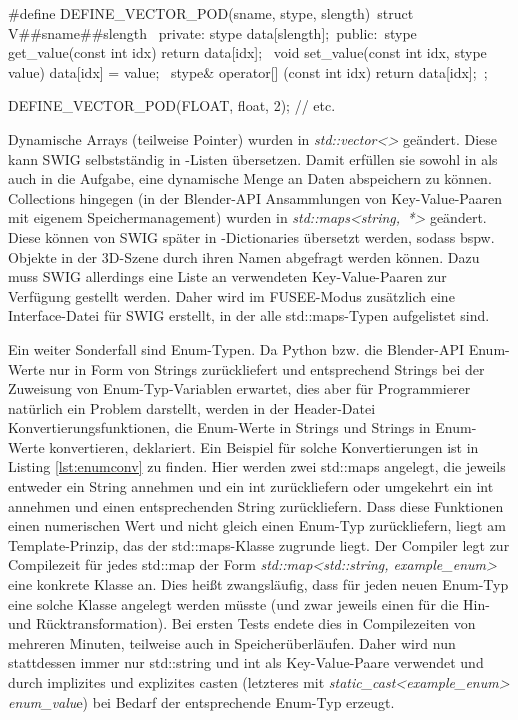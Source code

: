 \begin{code}[caption={Deklaration der Vektordatentypen mittels \protect\#define},label={lst:vfloat}]
#define DEFINE_VECTOR_POD(sname, stype, slength)\
	struct V##sname##slength {\
	private:
		stype data[slength];\
	public:\
		stype get_value(const int idx) { return data[idx]; }\
		void set_value(const int idx, stype value) { data[idx] = value; }\
		stype& operator[] (const int idx) {return data[idx];}\
	};

DEFINE_VECTOR_POD(FLOAT, float, 2);  // etc.
\end{code}

Dynamische Arrays (teilweise Pointer) wurden in \emph{std::vector<>} geändert. Diese kann SWIG selbstständig in \CS{}-Listen übersetzen. Damit erfüllen sie sowohl in \CC{} als auch in \CS{} die Aufgabe, eine dynamische Menge an Daten abspeichern zu können. Collections hingegen (in der Blender-API Ansammlungen von Key-Value-Paaren mit eigenem Speichermanagement) wurden in \mbox{\emph{std::maps<string, *>}} geändert. Diese können von SWIG später in \CS{}-Dictionaries übersetzt werden, sodass bspw. Objekte in der 3D-Szene durch ihren Namen abgefragt werden können. Dazu muss SWIG allerdings eine Liste an verwendeten Key-Value-Paaren zur Verfügung gestellt werden. Daher wird im FUSEE-Modus zusätzlich eine Interface-Datei für SWIG erstellt, in der alle std::maps-Typen aufgelistet sind.

Ein weiter Sonderfall sind Enum-Typen. Da Python bzw. die Blender-API Enum-Werte nur in Form von Strings zurückliefert und entsprechend Strings bei der Zuweisung von Enum-Typ-Variablen erwartet, dies aber für Programmierer natürlich ein Problem darstellt, werden in der Header-Datei Konvertierungsfunktionen, die Enum-Werte in Strings und Strings in Enum-Werte konvertieren, deklariert. Ein Beispiel für solche Konvertierungen ist in Listing \ref{lst:enumconv} zu finden. Hier werden zwei std::maps angelegt, die jeweils entweder ein String annehmen und ein int zurückliefern oder umgekehrt ein int annehmen und einen entsprechenden String zurückliefern. Dass diese Funktionen einen numerischen Wert und nicht gleich einen Enum-Typ zurückliefern, liegt am Template-Prinzip, das der std::maps-Klasse zugrunde liegt. Der Compiler legt zur Compilezeit für jedes std::map der Form \emph{std::map<std::string, example\_enum>} eine konkrete Klasse an. Dies heißt zwangsläufig, dass für jeden neuen Enum-Typ eine solche Klasse angelegt werden müsste (und zwar jeweils einen für die Hin- und Rücktransformation). Bei ersten Tests endete dies in Compilezeiten von mehreren Minuten, teilweise auch in Speicherüberläufen. Daher wird nun stattdessen immer nur std::string und int als Key-Value-Paare verwendet und durch implizites und explizites casten (letzteres mit \emph{static\_cast<example\_enum> enum\_valu}e) bei Bedarf der entsprechende Enum-Typ erzeugt. 

